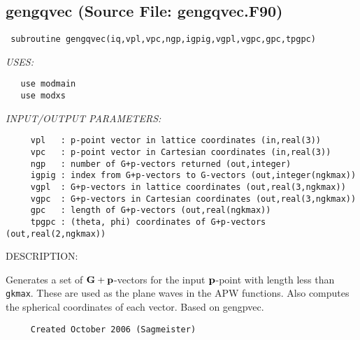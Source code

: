 \documentclass[11pt]{article}
\begin{document}
\subsection{gengqvec (Source File: gengqvec.F90)}


\begin{verbatim} subroutine gengqvec(iq,vpl,vpc,ngp,igpig,vgpl,vgpc,gpc,tpgpc)\end{verbatim}{\em USES:}
\begin{verbatim}   use modmain
   use modxs\end{verbatim}{\em INPUT/OUTPUT PARAMETERS:}
\begin{verbatim}     vpl   : p-point vector in lattice coordinates (in,real(3))
     vpc   : p-point vector in Cartesian coordinates (in,real(3))
     ngp   : number of G+p-vectors returned (out,integer)
     igpig : index from G+p-vectors to G-vectors (out,integer(ngkmax))
     vgpl  : G+p-vectors in lattice coordinates (out,real(3,ngkmax))
     vgpc  : G+p-vectors in Cartesian coordinates (out,real(3,ngkmax))
     gpc   : length of G+p-vectors (out,real(ngkmax))
     tpgpc : (theta, phi) coordinates of G+p-vectors (out,real(2,ngkmax))\end{verbatim}
{\sf DESCRIPTION:\\ }


     Generates a set of ${\bf G+p}$-vectors for the input ${\bf p}$-point with
     length less than {\tt gkmax}. These are used as the plane waves in the APW
     functions. Also computes the spherical coordinates of each vector.
     Based on gengpvec.
  
\begin{verbatim}     Created October 2006 (Sagmeister)\end{verbatim}











\end{document}
